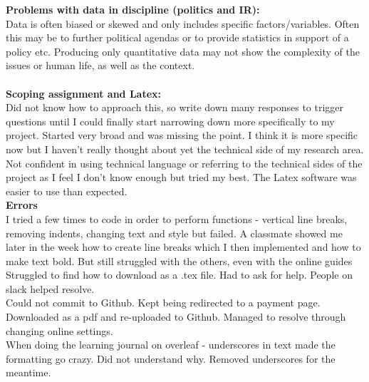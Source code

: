 \documentclass{article}
\begin{document}
\textbf{Problems with data in discipline (politics and IR):}\\
Data is often biased or skewed and only includes specific factors/variables. Often this may be to further political agendas or to provide statistics in support of a policy etc.
Producing only quantitative data may not show the complexity of the issues or human life, as well as the context.\\
\\
\textbf{Scoping assignment and Latex:}\\
Did not know how to approach this, so write down many responses to trigger questions until I could finally start narrowing down more specifically to my project. Started very broad and was missing the point. I think it is more specific now but I haven’t really thought about yet the technical side of my research area. \\
Not confident in using technical language or referring to the technical sides of the project as I feel I don’t know enough but tried my best.
The Latex software was easier to use than expected.\\
\textbf{Errors}\\
I tried a few times to code in order to perform functions - vertical line breaks, removing indents, changing text and style but failed. A classmate showed me later in the week how to create line breaks which I then implemented and how to make text bold. But still struggled with the others, even with the online guides\\
Struggled to find how to download as a .tex file. Had to ask for help. People on slack helped resolve. \\
Could not commit to Github. Kept being redirected to a payment page.
Downloaded as a pdf and re-uploaded to Github. Managed to resolve through changing online settings.\\
When doing the learning journal on overleaf - underscores in text made the formatting go crazy. Did not understand why. Removed underscores for the meantime. \\
\end{document}
